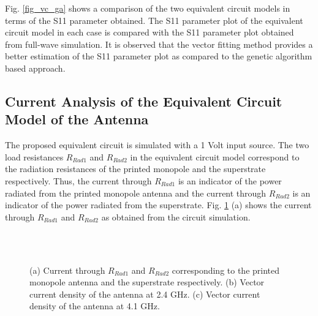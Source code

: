 Fig. \ref{fig_vc_ga} shows a comparison of the two equivalent circuit models in terms of the S11 parameter obtained. The S11 parameter plot of the equivalent circuit model in each case is compared with the S11 parameter plot obtained from full-wave simulation. It is observed that the vector fitting method provides a better estimation of the S11 parameter plot as compared to the genetic algorithm based approach.

\subsection{Current Analysis of the Equivalent Circuit Model of the Antenna}
The proposed equivalent circuit is simulated with a 1 Volt input source. The two load resistances $R_{Rad1}$ and $R_{Rad2}$ in the equivalent circuit model correspond to the radiation resistances of the printed monopole and the superstrate respectively. Thus, the current through $R_{Rad1}$ is an indicator of the power radiated from the printed monopole antenna and the current through $R_{Rad2}$ is an indicator of the power radiated from the superstrate. Fig. \ref{fig-ckt-current} (a) shows the current through $R_{Rad1}$ and $R_{Rad2}$ as obtained from the circuit simulation.

\begin{figure}
\centering
{}\\
~~~
\caption{(a) Current through $R_{Rad1}$ and $R_{Rad2}$ corresponding to the printed monopole antenna and the superstrate respectively. (b) Vector current density of the antenna at 2.4 GHz. (c) Vector current density of the antenna at 4.1 GHz.}\label{fig-ckt-current}
\end{figure}

